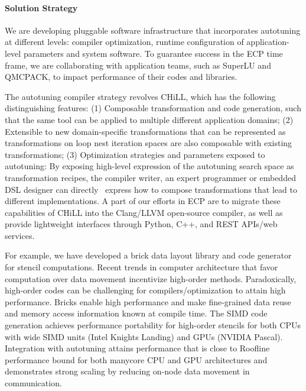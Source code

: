 \paragraph{Solution Strategy}
We are developing pluggable software infrastructure that incorporates
autotuning at different levels: compiler optimization, runtime configuration of application-level parameters and system software.
To guarantee success in the ECP time frame, we are collaborating with
application teams, such as SuperLU and QMCPACK, to impact performance of their
codes and libraries.

The autotuning compiler strategy revolves CHiLL, which has the following distinguishing features:
(1) Composable transformation and code generation, such
that the same tool can be applied
to multiple different application domains;
(2) Extensible to new domain-specific transformations that can be represented as transformations on loop nest iteration spaces are also
composable with existing transformations;
(3) Optimization strategies and parameters exposed to autotuning:
By exposing high-level expression
of the autotuning search space as transformation recipes, the compiler writer, an expert programmer or embedded DSL designer can directly \
express how to compose
 transformations that lead to different implementations.
A part of our efforts in ECP are to migrate these capabilities of CHiLL
into the Clang/LLVM open-source compiler, as well as provide lightweight
interfaces through Python, C++, and REST APIs/web services.

For example, we have developed a brick data layout library and code generator for
stencil computations.
Recent trends in computer architecture that favor computation over data movement incentivize high-order methods.  Paradoxically, high-order codes can be challenging for compilers/optimization to attain high performance.  Bricks enable high performance and make fine-grained data reuse and memory access information known at compile time.  The SIMD code generation achieves performance portability
for high-order stencils for both CPUs with wide SIMD units (Intel Knights
Landing) and GPUs (NVIDIA Pascal).  Integration with autotuning attains
performance that is close to Roofline performance bound for both manycore CPU
and GPU architectures and demonstrates strong scaling by reducing on-node data movement in communication.


